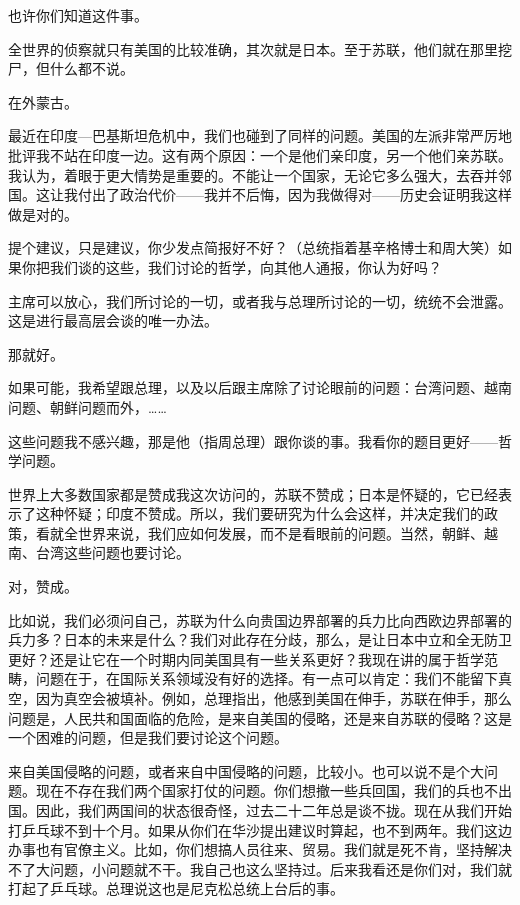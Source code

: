 也许你们知道这件事。

全世界的侦察就只有美国的比较准确，其次就是日本。至于苏联，他们就在那里挖尸，但什么都不说。

在外蒙古。

最近在印度—巴基斯坦危机中，我们也碰到了同样的问题。美国的左派非常严厉地批评我不站在印度一边。这有两个原因：一个是他们亲印度，另一个他们亲苏联。我认为，着眼于更大情势是重要的。不能让一个国家，无论它多么强大，去吞并邻国。这让我付出了政治代价——我并不后悔，因为我做得对——历史会证明我这样做是对的。

提个建议，只是建议，你少发点简报好不好？（总统指着基辛格博士和周大笑）如果你把我们谈的这些，我们讨论的哲学，向其他人通报，你认为好吗？

主席可以放心，我们所讨论的一切，或者我与总理所讨论的一切，统统不会泄露。这是进行最高层会谈的唯一办法。

那就好。

如果可能，我希望跟总理，以及以后跟主席除了讨论眼前的问题：台湾问题、越南问题、朝鲜问题而外，……

这些问题我不感兴趣，那是他（指周总理）跟你谈的事。我看你的题目更好——哲学问题。

世界上大多数国家都是赞成我这次访问的，苏联不赞成；日本是怀疑的，它已经表示了这种怀疑；印度不赞成。所以，我们要研究为什么会这样，并决定我们的政策，看就全世界来说，我们应如何发展，而不是看眼前的问题。当然，朝鲜、越南、台湾这些问题也要讨论。

对，赞成。

比如说，我们必须问自己，苏联为什么向贵国边界部署的兵力比向西欧边界部署的兵力多？日本的未来是什么？我们对此存在分歧，那么，是让日本中立和全无防卫更好？还是让它在一个时期内同美国具有一些关系更好？我现在讲的属于哲学范畴，问题在于，在国际关系领域没有好的选择。有一点可以肯定：我们不能留下真空，因为真空会被填补。例如，总理指出，他感到美国在伸手，苏联在伸手，那么问题是，人民共和国面临的危险，是来自美国的侵略，还是来自苏联的侵略？这是一个困难的问题，但是我们要讨论这个问题。

来自美国侵略的问题，或者来自中国侵略的问题，比较小。也可以说不是个大问题。现在不存在我们两个国家打仗的问题。你们想撤一些兵回国，我们的兵也不出国。因此，我们两国间的状态很奇怪，过去二十二年总是谈不拢。现在从我们开始打乒乓球不到十个月。如果从你们在华沙提出建议时算起，也不到两年。我们这边办事也有官僚主义。比如，你们想搞人员往来、贸易。我们就是死不肯，坚持解决不了大问题，小问题就不干。我自己也这么坚持过。后来我看还是你们对，我们就打起了乒乓球。总理说这也是尼克松总统上台后的事。

